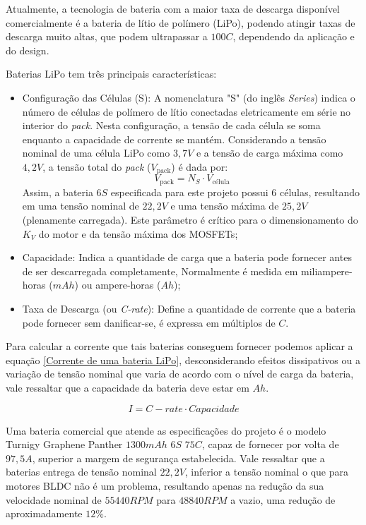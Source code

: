 \documentclass[12pt, a4paper, openright, oneside, brazilian]{abntex2}
\begin{document}
Atualmente, a tecnologia de bateria com a maior taxa de descarga disponível comercialmente é a bateria de lítio de polímero (LiPo), podendo atingir taxas de descarga muito altas, que podem ultrapassar a $100C$, dependendo da aplicação e do design. 

Baterias LiPo tem três principais características:
\begin{itemize}
\item Configuração das Células (S): A nomenclatura "S" (do inglês \textit{Series}) indica o número de células de polímero de lítio conectadas eletricamente em série no interior do \textit{pack}. Nesta configuração, a tensão de cada célula se soma enquanto a capacidade de corrente se mantém.
    Considerando a tensão nominal de uma célula LiPo como $3,7V$ e a tensão de carga máxima como $4,2V$, a tensão total do \textit{pack} ($V_{\text{pack}}$) é dada por:
    \begin{equation}
        V_{\text{pack}} = N_S \cdot V_{\text{célula}}
    \end{equation}
    Assim, a bateria $6S$ especificada para este projeto possui 6 células, resultando em uma tensão nominal de $22,2V$ e uma tensão máxima de $25,2V$ (plenamente carregada). Este parâmetro é crítico para o dimensionamento do $K_V$ do motor e da tensão máxima dos MOSFETs; 
\item Capacidade: Indica a quantidade de carga que a bateria pode fornecer antes de ser descarregada completamente, Normalmente é medida em miliampere-horas ($mAh$) ou ampere-horas ($Ah$);
\item Taxa de Descarga (ou \textit{C-rate}): Define a quantidade de corrente que a bateria pode fornecer sem danificar-se, é expressa em múltiplos de $C$.
\end{itemize}

Para calcular a corrente que tais baterias conseguem fornecer podemos aplicar a equação \ref{Corrente de uma bateria LiPo}, desconsiderando efeitos dissipativos ou a variação de tensão nominal que varia de acordo com o nível de carga da bateria, vale ressaltar que a capacidade da bateria deve estar em $Ah$.

\begin{equation}
I = C-rate \cdot Capacidade
\label{Corrente de uma bateria LiPo}
\end{equation}


Uma bateria comercial que atende as especificações do projeto é o modelo Turnigy Graphene Panther $1300mAh$ $6S$ $75C$, capaz de fornecer por volta de $97,5A$, superior a margem de segurança estabelecida. Vale ressaltar que a baterias entrega de tensão nominal $22,2V$, inferior a tensão nominal o que para motores BLDC não é um problema, resultando apenas na redução da  sua velocidade nominal de $55440 RPM$ para $48840RPM$ a vazio, uma redução de aproximadamente $12\%$. 
\end{document}
